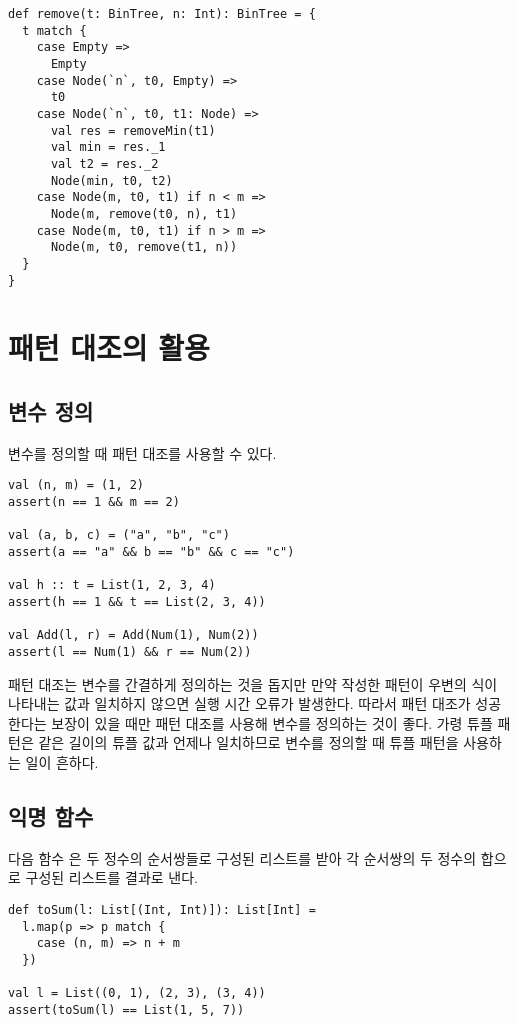 \begin{verbatim}
def remove(t: BinTree, n: Int): BinTree = {
  t match {
    case Empty =>
      Empty
    case Node(`n`, t0, Empty) =>
      t0
    case Node(`n`, t0, t1: Node) =>
      val res = removeMin(t1)
      val min = res._1
      val t2 = res._2
      Node(min, t0, t2)
    case Node(m, t0, t1) if n < m =>
      Node(m, remove(t0, n), t1)
    case Node(m, t0, t1) if n > m =>
      Node(m, t0, remove(t1, n))
  }
}
\end{verbatim}

\section{패턴 대조의 활용}

\subsection{변수 정의}

변수를 정의할 때 패턴 대조를 사용할 수 있다.

\begin{verbatim}
val (n, m) = (1, 2)
assert(n == 1 && m == 2)

val (a, b, c) = ("a", "b", "c")
assert(a == "a" && b == "b" && c == "c")

val h :: t = List(1, 2, 3, 4)
assert(h == 1 && t == List(2, 3, 4))

val Add(l, r) = Add(Num(1), Num(2))
assert(l == Num(1) && r == Num(2))
\end{verbatim}

패턴 대조는 변수를 간결하게 정의하는 것을 돕지만 만약 작성한 패턴이 우변의 식이
나타내는 값과 일치하지 않으면 실행 시간 오류가 발생한다. 따라서 패턴 대조가
성공한다는 보장이 있을 때만 패턴 대조를 사용해 변수를 정의하는 것이 좋다. 가령
튜플 패턴은 같은 길이의 튜플 값과 언제나 일치하므로 변수를 정의할 때 튜플 패턴을
사용하는 일이 흔하다.

\subsection{익명 함수}

다음 함수 은 두 정수의 순서쌍들로 구성된 리스트를 받아 각 순서쌍의
두 정수의 합으로 구성된 리스트를 결과로 낸다.

\begin{verbatim}
def toSum(l: List[(Int, Int)]): List[Int] =
  l.map(p => p match {
    case (n, m) => n + m
  })

val l = List((0, 1), (2, 3), (3, 4))
assert(toSum(l) == List(1, 5, 7))
\end{verbatim}

